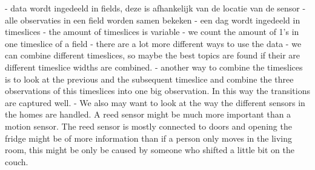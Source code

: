 \documentclass[11pt,a4paper]{article}
\begin{document}
- data wordt ingedeeld in fields, deze is afhankelijk van de locatie van de sensor
- alle observaties in een field worden samen bekeken
- een dag wordt ingedeeld in timeslices
- the amount of timeslices is variable
- we count the amount of 1's in one timeslice of a field
- there are a lot more different ways to use the data
- we can combine different timeslices, so maybe the best topics are found if their are different timeslice widths are combined.
- another way to combine the timeslices is to look at the previous and the subsequent timeslice and combine the three observations of this timeslices into one big observation. In this way the transitions are captured well.
- We also may want to look at the way the different sensors in the homes are handled. A reed sensor might be much more important than a motion sensor. The reed sensor is mostly connected to doors and opening the fridge might be of more information than if a person only moves in the living room, this might be only be caused by someone who shifted a little bit on the couch. 







% 
\end{document}
